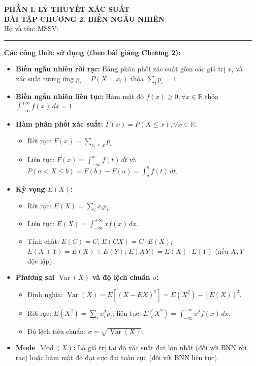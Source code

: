 \documentclass[12pt,a4paper]{article}
\theoremstyle{definition}
\begin{document}
\begin{center}
    {\large \textbf{PHẦN I. LÝ THUYẾT XÁC SUẤT}}\\[0.3em]
    {\LARGE \textbf{BÀI TẬP CHƯƠNG 2. BIẾN NGẪU NHIÊN}}\\[0.8em]
    {\normalsize Họ và tên: \dotfill\quad MSSV: \dotfill}
\end{center}

\vspace{0.5em}
\hrule
\vspace{1em}

\noindent\textbf{Các công thức sử dụng (theo bài giảng Chương 2):}
\begin{itemize}[leftmargin=1.5em]
    \item \textbf{Biến ngẫu nhiên rời rạc:} Bảng phân phối xác suất gồm các giá trị $x_i$ và xác suất tương ứng $p_i = P(X = x_i)$ thỏa $\sum_i p_i = 1$.
    \item \textbf{Biến ngẫu nhiên liên tục:} Hàm mật độ $f(x) \ge 0, \forall x \in \mathbb{R}$ thỏa $\displaystyle\int_{-\infty}^{+\infty} f(x)\,dx = 1$.
    \item \textbf{Hàm phân phối xác suất:} $F(x) = P(X \le x), \forall x \in \mathbb{R}$.
    \begin{itemize}
        \item Rời rạc: $F(x) = \sum_{x_i \le x} p_i$.
        \item Liên tục: $F(x) = \displaystyle\int_{-\infty}^x f(t)\,dt$ và $P(a < X \le b) = F(b) - F(a) = \displaystyle\int_a^b f(t)\,dt$.
    \end{itemize}
    \item \textbf{Kỳ vọng $E(X)$:}
    \begin{itemize}
        \item Rời rạc: $E(X) = \sum_i x_i p_i$.
        \item Liên tục: $E(X) = \displaystyle\int_{-\infty}^{+\infty} x f(x)\,dx$.
        \item Tính chất: $E(C) = C$; $E(CX) = C \cdot E(X)$; $E(X \pm Y) = E(X) \pm E(Y)$; $E(XY) = E(X) \cdot E(Y)$ (nếu $X, Y$ độc lập).
    \end{itemize}
    \item \textbf{Phương sai $\operatorname{Var}(X)$ và độ lệch chuẩn $\sigma$:}
    \begin{itemize}
        \item Định nghĩa: $\operatorname{Var}(X) = E\left[(X - EX)^2\right] = E(X^2) - [E(X)]^2$.
        \item Rời rạc: $E(X^2) = \sum_i x_i^2 p_i$; liên tục: $E(X^2) = \displaystyle\int_{-\infty}^{+\infty} x^2 f(x)\,dx$.
        \item Độ lệch tiêu chuẩn: $\sigma = \sqrt{\operatorname{Var}(X)}$.
    \end{itemize}
    \item \textbf{Mode $\operatorname{Mod}(X)$:} Là giá trị tại đó xác suất đạt lớn nhất (đối với BNN rời rạc) hoặc hàm mật độ đạt cực đại toàn cục (đối với BNN liên tục).
\end{itemize}
\end{document}
